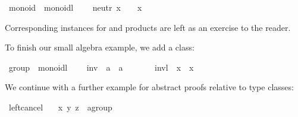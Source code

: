 \begin{isabellebody}
\ monoid\ {}\ monoidl\ {}\isanewline
\ \ \ neutr{}\ {}x\ {}\ {}\ {}\ x{}%
\begin{isamarkuptext}%
\noindent Corresponding instances for  and products
are left as an exercise to the reader.%
\end{isamarkuptext}%
\isamarkuptrue%
%
\isamarkuptrue%
%
\begin{isamarkuptext}%
\noindent To finish our small algebra example, we add a  class:%
\end{isamarkuptext}%
\isamarkuptrue%
\isamarkupfalse%
\ group\ {}\ monoidl\ {}\isanewline
\ \ \ inv\ {}{}\ {}{}a\ {}\ {}a{}\ {}{}{}\ {}{}\ {}{}{}{}\ {}{}{}\isanewline
\ \ \ invl{}\ {}{}\ x\ {}\ x\ {}\ {}{}%
\begin{isamarkuptext}%
\noindent We continue with a further example for abstract
proofs relative to type classes:%
\end{isamarkuptext}%
\isamarkuptrue%
\isamarkupfalse%
\ left{}cancel{}\isanewline
\ \ \ x\ y\ z\ {}{}\ {}{}a{}group{}\isanewline

\end{isabellebody}
